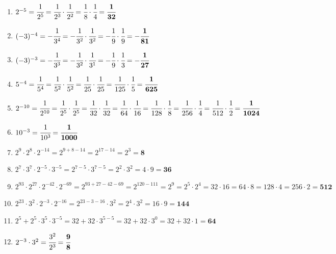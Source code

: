 \documentclass[a4paper,10pt]{article} %
\begin{document}
\begin{enumerate}[label=\alph*)]

  \item \(2^{-5} =
    \cfrac{1}{2^5} =
    \cfrac{1}{2^3} \cdot \cfrac{1}{2^2} =
    \cfrac{1}{8} \cdot \cfrac{1}{4} =
    \mathbf{\cfrac{1}{32}}\) %

  \item \((-3)^{-4} =
    -\cfrac{1}{3^4} =
    -\cfrac{1}{3^2} \cdot \cfrac{1}{3^2} =
    -\cfrac{1}{9} \cdot \cfrac{1}{9} =
    \mathbf{-\cfrac{1}{81}}\) %

  \item \((-3)^{-3} =
    -\cfrac{1}{3^3} =
    -\cfrac{1}{3^2} \cdot \cfrac{1}{3^1} =
    -\cfrac{1}{9} \cdot \cfrac{1}{3} =
    \mathbf{-\cfrac{1}{27}}\) %

  \item \(5^{-4} =
    \cfrac{1}{5^4} =
    \cfrac{1}{5^2} \cdot \cfrac{1}{5^2} =
    \cfrac{1}{25} \cdot \cfrac{1}{25} =
    \cfrac{1}{125} \cdot \cfrac{1}{5} =
    \mathbf{\cfrac{1}{625}}\) %

  \item \(2^{-10} =
    \cfrac{1}{2^{10}} =
    \cfrac{1}{2^5} \cdot \cfrac{1}{2^5} =
    \cfrac{1}{32} \cdot \cfrac{1}{32} =
    \cfrac{1}{64} \cdot \cfrac{1}{16} =
    \cfrac{1}{128} \cdot \cfrac{1}{8} =
    \cfrac{1}{256} \cdot \cfrac{1}{4} =
    \cfrac{1}{512} \cdot \cfrac{1}{2} =
    \mathbf{\cfrac{1}{1024}}\) %

  \item \(10^{-3} =
    \cfrac{1}{10^{3}} =
    \mathbf{\cfrac{1}{1000}}\) %

  \item \(2^9 \cdot 2^8 \cdot 2^{-14} =
    2^{9 + 8 - 14} =
    2^{17 - 14} =
    2^3 =
    \mathbf{8}\) %

  \item \(2^7 \cdot 3^7 \cdot 2^{-5} \cdot 3^{-5} =
    2^{7 - 5} \cdot 3^{7 - 5} =
    2^2 \cdot 3^2 =
    4 \cdot 9 =
    \mathbf{36}\) %

  \item \(2^{93} \cdot 2^{27} \cdot 2^{-42} \cdot 2^{-69} =
    2^{93 + 27 - 42 - 69} =
    2^{120 - 111} =
    2^9 =
    2^5 \cdot 2^4 =
    32 \cdot 16 =
    64 \cdot 8 =
    128 \cdot 4 =
    256 \cdot 2 =
    \mathbf{512}\) %

  \item \(2^{23} \cdot 3^2 \cdot 2^{-3} \cdot 2^{-16} =
    2^{23 - 3 - 16} \cdot 3^2 =
    2^4 \cdot 3^2 =
    16 \cdot 9 =
    \mathbf{144}\) %

  \item \(2^5 + 2^5 \cdot 3^5 \cdot 3^{-5} =
    32 + 32 \cdot 3^{5 - 5} =
    32 + 32 \cdot 3^0 =
    32 + 32 \cdot 1 =
    \mathbf{64}\) %

  \item \(2^{-3} \cdot 3^2 =
    \cfrac{3^2}{2^3} =
    \mathbf{\cfrac{9}{8}}\) %

\end{enumerate}
\end{document}
